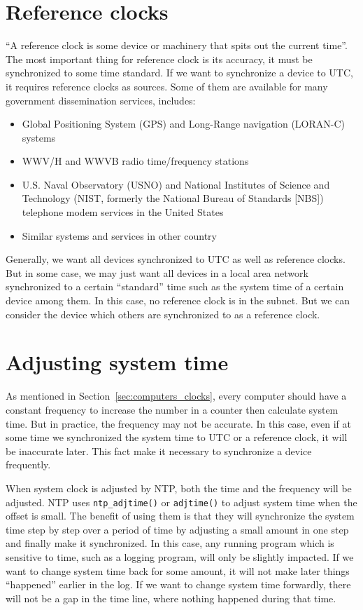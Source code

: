 \section{Reference clocks}%
\label{sec:reference_clocks}
``A reference clock is some device or machinery that spits out the current
time''. 
The most important thing for reference clock is its accuracy, it must be
synchronized to some time standard. If we want to synchronize a device to UTC,
it requires reference clocks as sources. Some of them are available for many
government dissemination services, includes:
\begin{itemize}
    \item Global Positioning System (GPS) and Long-Range navigation (LORAN-C)
        systems
    \item WWV/H and WWVB radio time/frequency stations
    \item U.S. Naval Observatory (USNO) and National Institutes of Science and
        Technology (NIST\null, formerly the National Bureau of Standards [NBS])
        telephone modem services in the United States
    \item Similar systems and services in other country
\end{itemize}
Generally, we want all devices synchronized to UTC as well as reference clocks.
But in some case, we may just want all devices in a local area network
synchronized to a certain ``standard'' time such as the system time of a
certain device among them. In this case, no reference clock is in the subnet.
But we can consider the device which others are synchronized to as a reference
clock. 

\section{Adjusting system time}%
\label{sec:adjusting_system_time}
As mentioned in Section~\ref{sec:computers_clocks}, every computer should have
a constant frequency to increase the number in a counter then calculate system
time. But in practice, the frequency may not be accurate. In this case, even if
at some time we synchronized the system time to UTC or a reference clock, it
will be inaccurate later. This fact make it necessary to synchronize a device
frequently.

When system clock is adjusted by NTP\null, both the time and the frequency
will be adjusted. NTP uses \verb|ntp_adjtime()| or \verb|adjtime()| to adjust
system time when the offset is small. The benefit of using them is that they
will synchronize the system time step by step over a period of time by
adjusting a small amount in one step and finally make it synchronized. In
this case, any running program which is sensitive to time, such as a logging
program, will only be slightly impacted. If we want to change system time
back for some amount, it will not make later things ``happened'' earlier in
the log. If we want to change system time forwardly, there will not be a gap
in the time line, where nothing happened during that time.




